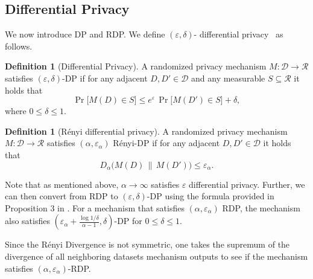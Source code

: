 \documentclass{article}
\theoremstyle{plain}
\theoremstyle{definition}
\newtheorem{definition}[theorem]{Definition}
\theoremstyle{remark}
\begin{document}
\subsection{Differential Privacy}
We now introduce DP and RDP.  We define $(\varepsilon,\delta)$-  differential privacy~\citep{DworkMNS06,DworkKMMN06}
as follows. 
\begin{definition}[Differential Privacy]
   A randomized privacy mechanism $M : \mathcal{D} \to \mathcal{R}$ satisfies $(\varepsilon, \delta)$-DP if for any adjacent $D, D' \in \mathcal{D}$ and any measurable $S \subseteq \mathcal{R}$ it holds that
\[
\Pr\!\big[M(D) \in S\big] \le e^{\varepsilon}\, \Pr\!\big[M(D') \in S\big] + \delta,
\]
where $0\le \delta \le1$.
\end{definition}

\begin{definition}[R\'enyi differential privacy]
    A randomized privacy mechanism $M : \mathcal{D} \to \mathcal{R}$
    satisfies $(\alpha, \varepsilon_\alpha)$  R\'enyi-DP \cite{mironov2017renyi}
    if for any adjacent $D, D' \in \mathcal{D}$ it holds that
\[
D_{\alpha} \big( M(D) \,\|\, M(D') \big) \leq \varepsilon_\alpha.
\]
\end{definition}
Note that as mentioned above, $\alpha \rightarrow \infty$ satisfies $\varepsilon$ differential privacy. Further, we can then convert from RDP to $(\varepsilon, \delta)$-DP using the formula provided in Proposition 3 in \cite{mironov2017renyi}. For a mechanism that satisfies $(\alpha, \varepsilon_\alpha)$ RDP, the mechanism also satisfies $(\varepsilon_\alpha + \frac{\log 1/ \delta}{\alpha -1}, \delta)$-DP for $0\le \delta \le 1$.

Since the R\'enyi Divergence is not symmetric, one takes the supremum of the divergence of all neighboring datasets mechanism outputs to see if the mechanism satisfies $(\alpha, \varepsilon_\alpha)$-RDP.


    
\end{document}
